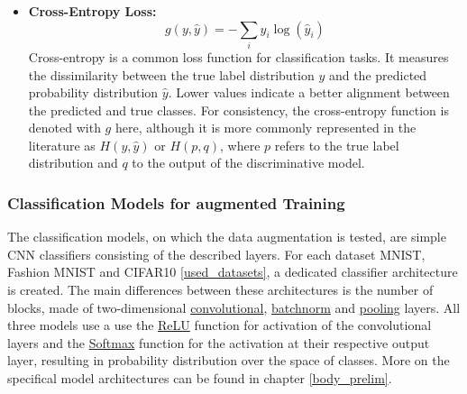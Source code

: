 \begin{itemize}
    \item \textbf{Cross-Entropy Loss:} \label{theoretical_loss_crossentropy}
    \begin{equation}
        g(y, \hat{y}) = -\sum_{i} y_i \log(\hat{y}_i)
    \end{equation}
    Cross-entropy is a common loss function for classification tasks. It measures the dissimilarity between the true label distribution \( y \) and the predicted probability distribution \( \hat{y} \). Lower values indicate a better alignment between the predicted and true classes. For consistency, the cross-entropy function is denoted with \( g \) here, although it is more commonly represented in the literature as \( H(y, \hat{y}) \) or \( H(p, q) \), where \( p \) refers to the true label distribution and \( q \) to the output of the discriminative model.


\end{itemize}

\subsubsection{Classification Models for augmented Training}
The classification models, on which the data augmentation is tested, are simple CNN classifiers consisting of the described layers. For each dataset MNIST, Fashion MNIST and CIFAR10 \ref{used_datasets}, a dedicated classifier architecture is created. The main differences between these architectures is the number of blocks, made of two-dimensional \hyperref[theoretical_classification_conv_layers]{convolutional}, \hyperref[theoretical_classification_batchnorm_layers]{batchnorm} and \hyperref[theoretical_classification_pooling_layers]{pooling} layers. All three models use a use the \hyperref[theoretical_activations_relu]{ReLU} function for activation of the convolutional layers and the \hyperref[theoretical_activations_softmax]{Softmax} function for the activation at their respective output layer, resulting in probability distribution over the space of classes. More on the specifical model architectures can be found in chapter \ref{body_prelim}. %


